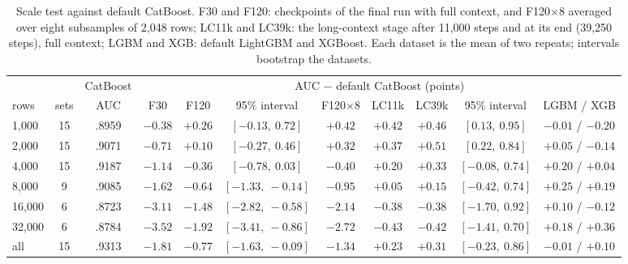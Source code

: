 \documentclass[11pt]{article}
\begin{document}
\begin{table}[t]
\centering
\footnotesize
\setlength{\tabcolsep}{4pt}
\begin{tabular}{lcccccccccc}
\toprule
& & CatBoost & \multicolumn{8}{c}{AUC $-$ default CatBoost (points)} \\
\cmidrule(lr){4-11}
rows & sets & AUC & F30 & F120 & 95\% interval & F120$\times$8 & LC11k & LC39k & 95\% interval & LGBM / XGB \\
\midrule
1,000 & 15 & .8959 & $-0.38$ & $+0.26$ & $[-0.13,\ 0.72]$ & $+0.42$ & $+0.42$ & $+0.46$ & $[0.13,\ 0.95]$ & $-0.01$ / $-0.20$ \\
2,000 & 15 & .9071 & $-0.71$ & $+0.10$ & $[-0.27,\ 0.46]$ & $+0.32$ & $+0.37$ & $+0.51$ & $[0.22,\ 0.84]$ & $+0.05$ / $-0.14$ \\
4,000 & 15 & .9187 & $-1.14$ & $-0.36$ & $[-0.78,\ 0.03]$ & $-0.40$ & $+0.20$ & $+0.33$ & $[-0.08,\ 0.74]$ & $+0.20$ / $+0.04$ \\
8,000 & 9 & .9085 & $-1.62$ & $-0.64$ & $[-1.33,\ -0.14]$ & $-0.95$ & $+0.05$ & $+0.15$ & $[-0.42,\ 0.74]$ & $+0.25$ / $+0.19$ \\
16,000 & 6 & .8723 & $-3.11$ & $-1.48$ & $[-2.82,\ -0.58]$ & $-2.14$ & $-0.38$ & $-0.38$ & $[-1.70,\ 0.92]$ & $+0.10$ / $-0.12$ \\
32,000 & 6 & .8784 & $-3.52$ & $-1.92$ & $[-3.41,\ -0.86]$ & $-2.72$ & $-0.43$ & $-0.42$ & $[-1.41,\ 0.70]$ & $+0.18$ / $+0.36$ \\
all & 15 & .9313 & $-1.81$ & $-0.77$ & $[-1.63,\ -0.09]$ & $-1.34$ & $+0.23$ & $+0.31$ & $[-0.23,\ 0.86]$ & $-0.01$ / $+0.10$ \\
\bottomrule
\end{tabular}
\caption{Scale test against default CatBoost. F30 and F120: checkpoints of the final run with full
context, and F120$\times$8 averaged over eight subsamples of 2,048 rows; LC11k and LC39k: the long-context
stage after 11,000 steps and at its end (39,250 steps), full context; LGBM and XGB: default LightGBM and XGBoost. Each
dataset is the mean of two repeats; intervals bootstrap the datasets.}
\label{tab:scale}
\end{table}
\end{document}
